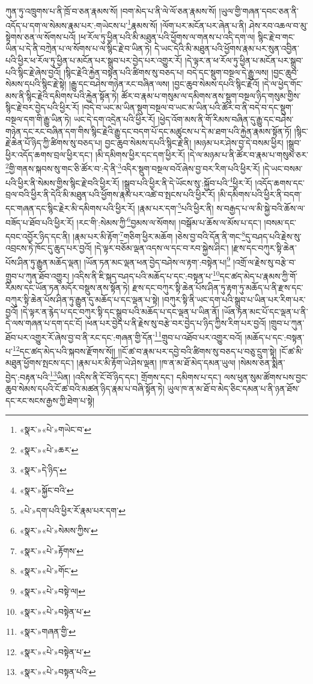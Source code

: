 ཀུན་ཏུ་འཁྲུགས་པ་ནི་ཁྲོ་བ་ཅན་རྣམས་སོ། །བག་མེད་པ་ནི་ལེ་ལོ་ཅན་རྣམས་སོ། །ཡུལ་གྱི་གཞན་དབང་ཅན་ནི་འདོད་པ་དག་ལ་སེམས་རྣམ་པར་:གཡེངས་པ་\footnote{«སྣར་»«པེ་»གཡེང་བ་}རྣམས་སོ། །ལོག་པར་མངོན་པར་ཞེན་པ་ནི། ཤེས་རབ་འཆལ་བ་མུ་སྟེགས་ཅན་ལ་སོགས་པའོ། །ཕ་རོལ་ཏུ་ཕྱིན་པའི་མི་མཐུན་པའི་ཕྱོགས་ལ་གནས་པ་འདི་དག་ལ། སྙིང་རྗེ་བ་གང་ཡིན་པ་དེ་ནི་བཀྲེན་པ་ལ་སོགས་པ་ལ་སྙིང་རྗེ་བ་ཡིན་ཏེ། དེ་ཡང་དེའི་མི་མཐུན་པའི་ཕྱོགས་རྣམ་པར་སུན་འབྱིན་པའི་ཕྱིར་ཕ་རོལ་ཏུ་ཕྱིན་པ་མངོན་པར་སྒྲུབ་པར་བྱེད་པར་འགྱུར་རོ། །དེ་ལྟར་ན་ཕ་རོལ་ཏུ་ཕྱིན་པ་མངོན་པར་སྒྲུབ་པའི་སྙིང་རྗེ་ཞེས་བྱའོ། །སྙིང་རྗེའི་རྐྱེན་བསྟན་པའི་ཚིགས་སུ་བཅད་པ། བདེ་དང་སྡུག་བསྔལ་དེ་རྒྱུ་ལས། །བྱང་ཆུབ་སེམས་དཔའི་སྙིང་རྗེ་སྟེ། །རྒྱུ་དང་བཤེས་གཉེན་རང་བཞིན་ལས། །བྱང་ཆུབ་སེམས་དཔའི་སྙིང་རྗེའོ། །དེ་ལ་ཕྱེད་གོང་མས་ནི་སྙིང་རྗེའི་དམིགས་པའི་རྐྱེན་སྟོན་ཏེ། ཚོར་བ་རྣམ་པ་གསུམ་ལ་དམིགས་ནས་སྡུག་བསྔལ་ཉིད་གསུམ་གྱིས་སྙིང་རྗེ་བར་བྱེད་པའི་ཕྱིར་རོ། །བདེ་བ་ཡང་མ་ཡིན་སྡུག་བསྔལ་བ་ཡང་མ་ཡིན་པའི་ཚོར་བ་ནི་བདེ་བ་དང་སྡུག་བསྔལ་དག་གི་རྒྱུ་ཡིན་ཏེ། ཡང་དེ་དག་འདྲེན་པའི་ཕྱིར་རོ། །ཕྱེད་འོག་མས་ནི་གོ་རིམས་བཞིན་དུ་རྒྱུ་དང་བཤེས་གཉེན་དང་རང་བཞིན་དག་གིས་སྙིང་རྗེའི་རྒྱུ་དང་བདག་པོ་དང་མཚུངས་པ་དེ་མ་ཐག་པའི་རྐྱེན་རྣམས་སྟོན་ཏོ། །སྙིང་རྗེ་ཆེན་པོ་ཉིད་ཀྱི་ཚིགས་སུ་བཅད་པ། བྱང་ཆུབ་སེམས་དཔའི་སྙིང་རྗེ་ནི། །མཉམ་པར་ཤེས་བྱ་དེ་བསམ་ཕྱིར། །སྒྲུབ་ཕྱིར་འདོད་ཆགས་བྲལ་ཕྱིར་དང་། །མི་དམིགས་ཕྱིར་དང་དག་ཕྱིར་རོ། །དེ་ལ་མཉམ་པ་ནི་ཚོར་བ་རྣམ་པ་གསུམ་ཅར་\footnote{«སྣར་»«པེ་»ཆར་}གྱི་གནས་སྐབས་སུ་གང་ཅི་ཚོར་བ་:དེ་ནི་\footnote{«སྣར་»དེ་ཉིད་}འདིར་སྡུག་བསྔལ་བའོ་ཞེས་བྱ་བར་རིག་པའི་ཕྱིར་རོ། །དེ་ཡང་བསམ་པའི་ཕྱིར་ནི་སེམས་གྱིས་སྙིང་རྗེ་བའི་ཕྱིར་རོ། །སྒྲུབ་པའི་ཕྱིར་ནི་དེ་ཡོངས་སུ་:སྐྱོབ་པའི་\footnote{«སྣར་»སྐྱོང་བའི་}ཕྱིར་རོ། །འདོད་ཆགས་དང་བྲལ་བའི་ཕྱིར་ནི་དེའི་མི་མཐུན་པའི་ཕྱོགས་རྣམ་པར་འཚེ་བ་སྤངས་པའི་ཕྱིར་རོ། །མི་དམིགས་པའི་ཕྱིར་ནི་བདག་དང་གཞན་དང་སྙིང་རྗེར་མི་དམིགས་པའི་ཕྱིར་རོ། །རྣམ་པར་དག་\footnote{«པེ་»དག་པའི་ཕྱིར་རོ་རྣམ་པར་དག་}པའི་ཕྱིར་ནི། ས་བརྒྱད་པ་ལ་མི་སྐྱེ་བའི་ཆོས་ལ་བཟོད་པ་ཐོབ་པའི་ཕྱིར་རོ། །རང་གི་:སེམས་ཀྱི་\footnote{«སྣར་»«པེ་»སེམས་ཀྱིས་}བྱམས་ལ་སོགས། །བསྒོམ་པ་ཆོས་ལ་མོས་པ་དང་། །བསམ་དང་དབང་འབྱོར་ཉིད་དང་ནི། །རྣམ་པར་མི་རྟོག་\footnote{«སྣར་»«པེ་»རྟོགས་}གཅིག་ཕྱིར་མཆོག །ཅེས་བྱ་བའི་དོན་ནི་གང་\footnote{«སྣར་»«པེ་»གོང་}དུ་བཤད་པའི་རྗེས་སུ་འབྲངས་ཏེ་ཁོང་དུ་ཆུད་པར་བྱའོ། །དེ་ལྟར་བཅོམ་ལྡན་འདས་ལ་དང་བ་རབ་སྐྱེས་ཤིང་། །རྫས་དང་བཀུར་སྟི་ཆེན་པོས་ཤིན་ཏུ་རྒྱུན་མཆོད་ལྡན། །ཡོན་ཏན་མང་ལྡན་ཕན་བྱེད་བཤེས་ལ་རྟག་:བསྟེན་པ།\footnote{«སྣར་»«པེ་»བསྟེ་ལ།} །འགྲོ་ལ་རྗེས་སུ་བརྩེ་བ་གྲུབ་པ་ཀུན་ཐོབ་འགྱུར། །འདིས་ནི་ཇི་སྐད་བཤད་པའི་མཆོད་པ་དང་:བསྟན་པ་\footnote{«སྣར་»«པེ་»བསྟེན་པ་}དང་ཚད་མེད་པ་རྣམས་ཀྱི་གོ་རིམས་དང་ཡོན་ཏན་མདོར་བསྡུས་ནས་སྟོན་ཏེ། རྫས་དང་བཀུར་སྟི་ཆེན་པོས་ཤིན་ཏུ་རྟག་ཏུ་མཆོད་པ་ནི་རྫས་དང་བཀུར་སྟི་ཆེན་པོས་ཤིན་ཏུ་རྒྱུན་དུ་མཆོད་པ་དང་ལྡན་པ་སྟེ། །བཀུར་སྟི་ནི་ཡང་དག་པའི་སྒྲུབ་པ་ཡིན་པར་རིག་པར་བྱའོ། །དེ་ལྟར་ན་རྙེད་པ་དང་བཀུར་སྟི་དང་སྒྲུབ་པའི་མཆོད་པ་དང་ལྡན་པ་ཡིན་ནོ། །ཡོན་ཏན་མང་པོ་དང་ལྡན་པ་ནི་དེ་ལས་གཞན་པ་དག་དང་ངོ། །ཕན་པར་བྱེད་པ་ནི་རྗེས་སུ་བརྩེ་བར་བྱེད་པ་ཉིད་ཀྱིས་རིག་པར་བྱའོ། །གྲུབ་པ་ཀུན་ཐོབ་པར་འགྱུར་རོ་ཞེས་བྱ་བ་ནི་རང་དང་:གཞན་གྱི་དོན་\footnote{«སྣར་»གཞན་གྱི་}གྲུབ་པ་འཐོབ་པར་འགྱུར་བའོ། །མཆོད་པ་དང་:བསྟན་པ་\footnote{«སྣར་»«པེ་»བསྟེན་པ་}དང་ཚད་མེད་པའི་སྐབས་རྫོགས་སོ།། །།ངོ་ཚ་བ་རྣམ་པར་དབྱེ་བའི་ཚིགས་སུ་བཅད་པ་བཅུ་དྲུག་སྟེ། །ངོ་ཚ་མི་མཐུན་ཕྱོགས་སྤངས་དང་། །རྣམ་པར་མི་རྟོག་ཡེ་ཤེས་ལྡན། །ཁ་ན་མ་ཐོ་མེད་དམན་ཡུལ། །སེམས་ཅན་སྨིན་བྱེད་:བརྟན་པའི་\footnote{«སྣར་»«པེ་»བསྟན་པའི་}ཡིན། །འདིས་ནི་ངོ་བོ་ཉིད་དང་། གྲོགས་དང་། དམིགས་པ་དང་། ལས་ཕུན་སུམ་ཚོགས་པས་བྱང་ཆུབ་སེམས་དཔའི་ངོ་ཚ་བའི་མཚན་ཉིད་རྣམ་པ་བཞི་སྟོན་ཏེ། ཡུལ་ཁ་ན་མ་ཐོ་བ་མེད་ཅིང་དམན་པ་ནི་ཉན་ཐོས་དང་རང་སངས་རྒྱས་ཀྱི་ཐེག་པ་སྟེ། 